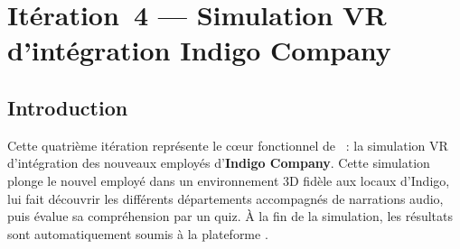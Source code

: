 %
%

\chapter{Itération~4 --- Simulation VR d'intégration Indigo Company}

\section{Introduction}

Cette quatrième itération représente le cœur fonctionnel de \tynassit{}~: la simulation VR
d'intégration des nouveaux employés d'\textbf{Indigo Company}. Cette simulation plonge le nouvel employé dans un environnement 3D fidèle aux locaux d'Indigo, lui fait découvrir les différents départements accompagnés de narrations audio, puis évalue sa compréhension par un quiz. À la fin de la simulation,
les résultats sont automatiquement soumis à la plateforme \tynassit{}.


